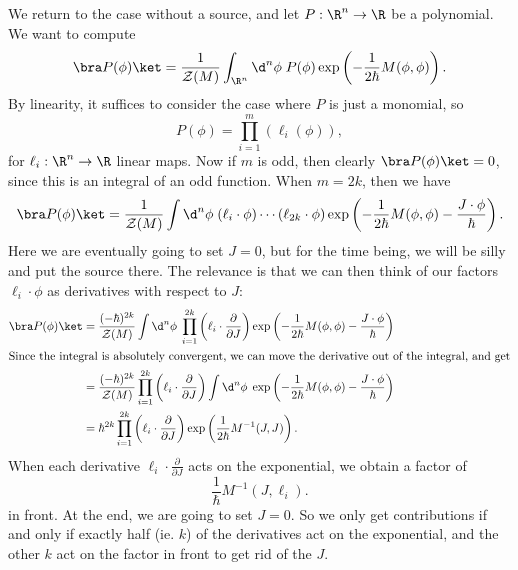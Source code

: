 \documentclass[a4paper]{article}
\begin{document}
We return to the case without a source, and let $P: \R^n \to \R$ be a polynomial. We want to compute
\[
  \bra P(\phi)\ket = \frac{1}{\mathcal{Z}(M)} \int_{\R^n} \d^n \phi\; P(\phi) \exp\left(-\frac{1}{2\hbar} M(\phi, \phi)\right).
\]
By linearity, it suffices to consider the case where $P$ is just a monomial, so
\[
  P(\phi) = \prod_{i = 1}^m (\ell_i(\phi)),
\]
for $\ell_i : \R^n \to \R$ linear maps. Now if $m$ is odd, then clearly $\bra P(\phi)\ket = 0$, since this is an integral of an odd function. When $m = 2k$, then we have
\[
  \bra P(\phi) \ket = \frac{1}{\mathcal{Z}(M)} \int \d^n \phi\; (\ell_i\cdot \phi) \cdots (\ell_{2k} \cdot \phi) \exp\left(-\frac{1}{2\hbar}M (\phi, \phi) - \frac{J \cdot \phi}{\hbar}\right).
\]
Here we are eventually going to set $J = 0$, but for the time being, we will be silly and put the source there. The relevance is that we can then think of our factors $\ell_i \cdot \phi$ as derivatives with respect to $J$:
\begin{align*}
  \bra P(\phi)\ket &= \frac{(-\hbar)^{2k}}{\mathcal{Z}(M)} \int \d^n \phi \; \prod_{i = 1}^{2k} \left(\ell_i \cdot \frac{\partial}{\partial J}\right) \exp\left(-\frac{1}{2\hbar} M(\phi, \phi) - \frac{J\cdot \phi}{\hbar}\right)\\
  \intertext{Since the integral is absolutely convergent, we can move the derivative out of the integral, and get}
  &= \frac{(-\hbar)^{2k}}{\mathcal{Z}(M)} \prod_{i = 1}^{2k} \left(\ell_i \cdot \frac{\partial}{\partial J}\right) \int \d^n \phi \; \exp\left(-\frac{1}{2\hbar} M(\phi, \phi) - \frac{J\cdot \phi}{\hbar}\right)\\
  &= \hbar^{2k} \prod_{i = 1}^{2k} \left(\ell_i \cdot \frac{\partial}{\partial J}\right) \exp\left(\frac{1}{2\hbar}M^{-1}(J, J)\right).
\end{align*}
When each derivative $\ell_i \cdot \frac{\partial}{\partial J}$ acts on the exponential, we obtain a factor of
\[
  \frac{1}{\hbar} M^{-1}(J, \ell_i).
\]
in front. At the end, we are going to set $J = 0$. So we only get contributions if and only if exactly half (ie. $k$) of the derivatives act on the exponential, and the other $k$ act on the factor in front to get rid of the $J$.
\end{document}
